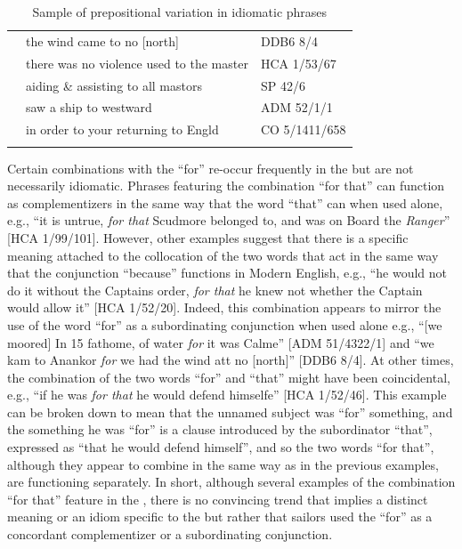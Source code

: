\begin{table}
\begin{tabularx}{\textwidth}{lQl}
& the wind came to no [north] & DDB6 8/4\\
 & there was no violence used to the master & HCA 1/53/67\\
 & aiding \& assisting to all mastors & SP 42/6\\
 & saw a ship to westward & ADM 52/1/1\\
 & in order to your returning to Engld & CO 5/1411/658\\
\lspbottomrule
\end{tabularx}
\caption{\label{tab:key:7.2} Sample of prepositional variation in idiomatic phrases}
\end{table} 


Certain combinations with the  “for” re-occur frequently in the  but are not necessarily idiomatic. Phrases featuring the combination “for that” can function as complementizers in the same way that the word “that” can when used alone, e.g., “it is untrue, \textit{for that} Scudmore belonged to, and was on Board the \textit{Ranger}” [HCA 1/99/101]. However, other examples suggest that there is a specific meaning attached to the collocation of the two words that act in the same way that the conjunction “because” functions in Modern English, e.g., “he would not do it without the Captains order, \textit{for that} he knew not whether the Captain would allow it” [HCA 1/52/20]. Indeed, this combination appears to mirror the use of the word “for” as a subordinating conjunction when used alone e.g., “[we moored] In 15 fathome, of water \textit{for} it was Calme” [ADM 51/4322/1] and “we kam to Anankor \textit{for} we had the wind att no [north]” [DDB6 8/4]. At other times, the combination of the two words “for” and “that” might have been coincidental, e.g., “if he was \textit{for that} he would defend himselfe” [HCA 1/52/46]. This example can be broken down to mean that the unnamed subject was “for” something, and the something he was “for” is a clause introduced by the subordinator “that”, expressed as “that he would defend himself”, and so the two words “for that”, although they appear to combine in the same way as in the previous examples, are functioning separately. In short, although several examples of the combination “for that” feature in the , there is no convincing trend that implies a distinct meaning or an idiom specific to the  but rather that sailors used the  “for” as a concordant complementizer or a subordinating conjunction. 


